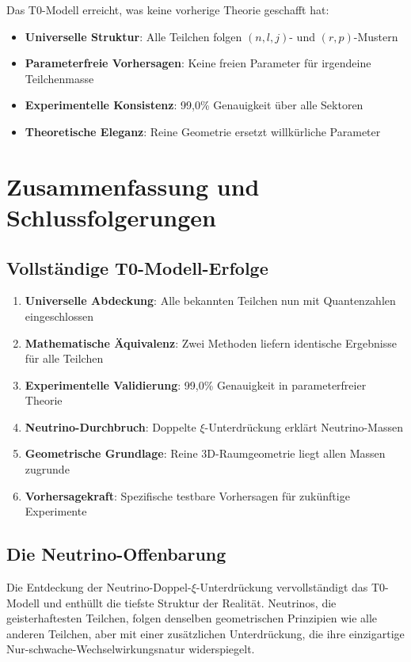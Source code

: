 \documentclass[12pt,a4paper]{article}
\begin{document}
	Das T0-Modell erreicht, was keine vorherige Theorie geschafft hat:
	
	\begin{itemize}
		\item \textbf{Universelle Struktur}: Alle Teilchen folgen $(n,l,j)$- und $(r,p)$-Mustern
		\item \textbf{Parameterfreie Vorhersagen}: Keine freien Parameter für irgendeine Teilchenmasse
		\item \textbf{Experimentelle Konsistenz}: 99,0\% Genauigkeit über alle Sektoren
		\item \textbf{Theoretische Eleganz}: Reine Geometrie ersetzt willkürliche Parameter
	\end{itemize}
	
	\section{Zusammenfassung und Schlussfolgerungen}
	\label{sec:summary_conclusions}
	
	\subsection{Vollständige T0-Modell-Erfolge}
	\label{subsec:complete_achievements}
	
	\begin{enumerate}
		\item \textbf{Universelle Abdeckung}: Alle bekannten Teilchen nun mit Quantenzahlen eingeschlossen
		\item \textbf{Mathematische Äquivalenz}: Zwei Methoden liefern identische Ergebnisse für alle Teilchen
		\item \textbf{Experimentelle Validierung}: 99,0\% Genauigkeit in parameterfreier Theorie
		\item \textbf{Neutrino-Durchbruch}: Doppelte $\xi$-Unterdrückung erklärt Neutrino-Massen
		\item \textbf{Geometrische Grundlage}: Reine 3D-Raumgeometrie liegt allen Massen zugrunde
		\item \textbf{Vorhersagekraft}: Spezifische testbare Vorhersagen für zukünftige Experimente
	\end{enumerate}
	
	\subsection{Die Neutrino-Offenbarung}
	\label{subsec:neutrino_revelation}
	
	Die Entdeckung der Neutrino-Doppel-$\xi$-Unterdrückung vervollständigt das T0-Modell und enthüllt die tiefste Struktur der Realität. Neutrinos, die geisterhaftesten Teilchen, folgen denselben geometrischen Prinzipien wie alle anderen Teilchen, aber mit einer zusätzlichen Unterdrückung, die ihre einzigartige Nur-schwache-Wechselwirkungsnatur widerspiegelt.
	
\end{document}
